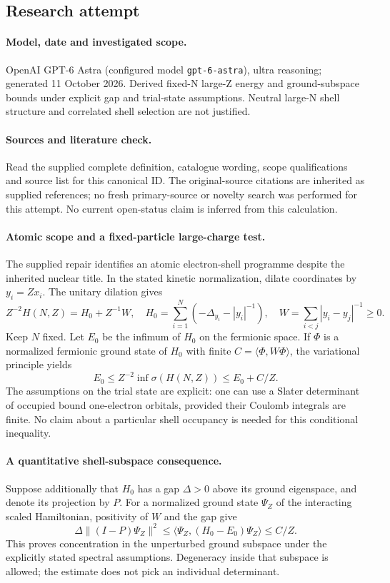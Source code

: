 \documentclass[11pt]{article}
\begin{document}
\subsection{Research attempt}
\paragraph{Model, date and investigated scope.}
OpenAI GPT-6 Astra (configured model \texttt{gpt-6-astra}), ultra reasoning; generated 11 October 2026. Derived fixed-N large-Z energy and ground-subspace bounds under explicit gap and trial-state assumptions. Neutral large-N shell structure and correlated shell selection are not justified.

\paragraph{Sources and literature check.}
Read the supplied complete definition, catalogue wording, scope qualifications and source list for this canonical ID. The original-source citations are inherited as supplied references; no fresh primary-source or novelty search was performed for this attempt. No current open-status claim is inferred from this calculation.

\paragraph{Atomic scope and a fixed-particle large-charge test.}The supplied repair identifies an atomic electron-shell programme despite the inherited nuclear title. In the stated kinetic normalization, dilate coordinates by \(y_i=Zx_i\). The unitary dilation gives
\[Z^{-2}H(N,Z)=H_0+Z^{-1}W,\quad H_0=\sum_{i=1}^N(-\Delta_{y_i}-|y_i|^{-1}),\quad W=\sum_{i<j}|y_i-y_j|^{-1}\ge0.\]
Keep \(N\) fixed. Let \(E_0\) be the infimum of \(H_0\) on the fermionic space. If \(\Phi\) is a normalized fermionic ground state of \(H_0\) with finite \(C=\langle\Phi,W\Phi\rangle\), the variational principle yields
\[E_0\le Z^{-2}\inf\sigma(H(N,Z))\le E_0+C/Z.\]
The assumptions on the trial state are explicit: one can use a Slater determinant of occupied bound one-electron orbitals, provided their Coulomb integrals are finite. No claim about a particular shell occupancy is needed for this conditional inequality.
\paragraph{A quantitative shell-subspace consequence.}Suppose additionally that \(H_0\) has a gap \(\Delta>0\) above its ground eigenspace, and denote its projection by \(P\). For a normalized ground state \(\Psi_Z\) of the interacting scaled Hamiltonian, positivity of \(W\) and the gap give
\[\Delta\|(I-P)\Psi_Z\|^2\le\langle\Psi_Z,(H_0-E_0)\Psi_Z\rangle\le C/Z.
\]
This proves concentration in the unperturbed ground subspace under the explicitly stated spectral assumptions. Degeneracy inside that subspace is allowed; the estimate does not pick an individual determinant.
\end{document}
